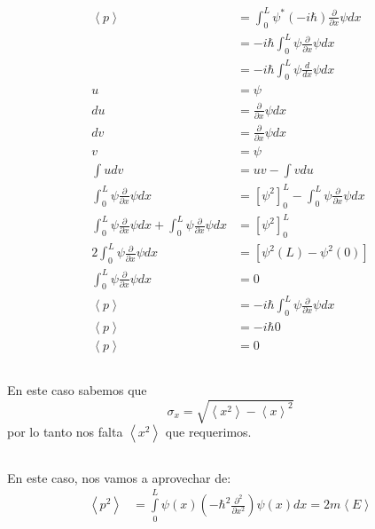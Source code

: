 \documentclass{report}
\begin{document}
\subsection{}

\begin{align*}
  \left< p \right> &= \int_0^L \psi^* (-i \hbar) \frac{\partial }{\partial x} \psi dx \\
  &= -i \hbar\int_0^L \psi \frac{\partial }{\partial x} \psi dx \\
  &= -i \hbar\int_0^L \psi \frac{d }{dx} \psi dx \\
  u &= \psi\\
  du &= \frac{\partial}{\partial x} \psi dx\\
  dv &= \frac{\partial}{\partial x} \psi dx\\
  v &= \psi\\
  \int udv &= uv - \int vdu\\
  \int_0^L \psi \frac{\partial }{\partial x} \psi dx &= \left[\psi^2\right]_0^L - \int_0^L \psi \frac{\partial}{\partial x}\psi dx\\
  \int_0^L \psi \frac{\partial }{\partial x} \psi dx + \int_0^L \psi \frac{\partial}{\partial x}\psi dx &= \left[\psi^2\right]_0^L\\
  2 \int_0^L \psi \frac{\partial }{\partial x} \psi dx &= \left[\psi^2(L) - \psi^2(0)\right]\\
  \int_0^L \psi \frac{\partial }{\partial x} \psi dx &= 0\\
  \left< p \right> &= -i \hbar\int_0^L \psi \frac{\partial }{\partial x} \psi dx \\
  \left< p \right> &= -i \hbar 0\\
  \left< p \right> &= 0
\end{align*}

\subsection{}

En este caso sabemos que \[\sigma_x = \sqrt{\left<x^2\right> - \left<x\right>^2}\] por lo tanto nos falta $\left< x^2 \right>$ que requerimos.

\subsection{}

En este caso, nos vamos a aprovechar de:
\begin{align*}
  \left< p^2 \right> &= \int\limits_0^L \psi(x)\left( -\hbar^2 \frac{\partial^2}{\partial x^2}\right)\psi(x) dx = 2m\left<E\right>
\end{align*}
\end{document}
